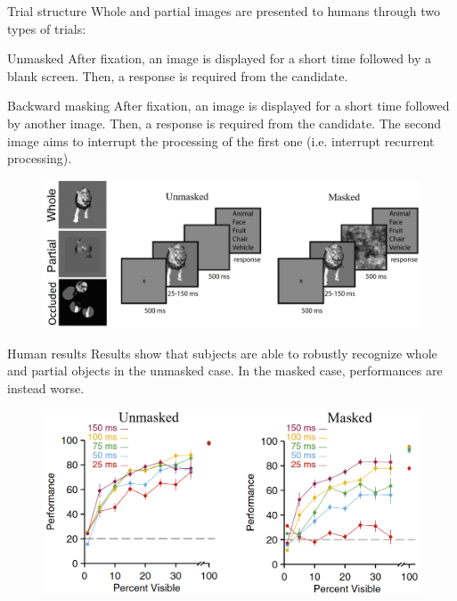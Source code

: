 \begin{casestudy}
    \phantom{}
    \begin{descriptionlist}
        \item[Trial structure] 
            Whole and partial images are presented to humans through two types of trials:
            \begin{descriptionlist}
                \item[Unmasked] 
                    After fixation, an image is displayed for a short time followed by a blank screen. Then, a response is required from the candidate.
        
                \item[Backward masking] 
                    After fixation, an image is displayed for a short time followed by another image. Then, a response is required from the candidate.
                    The second image aims to interrupt the processing of the first one (i.e. interrupt recurrent processing).
            \end{descriptionlist}
        
            \begin{figure}[H]
                \centering
                \includegraphics[width=0.55\linewidth]{./img/pattern_completion1.png}
            \end{figure}

        \item[Human results]
            Results show that subjects are able to robustly recognize whole and partial objects in the unmasked case.
            In the masked case, performances are instead worse.
            \begin{figure}[H]
                \centering
                \includegraphics[width=0.5\linewidth]{./img/pattern_completion2.png}
            \end{figure}
        

\end{descriptionlist}
\end{casestudy}
